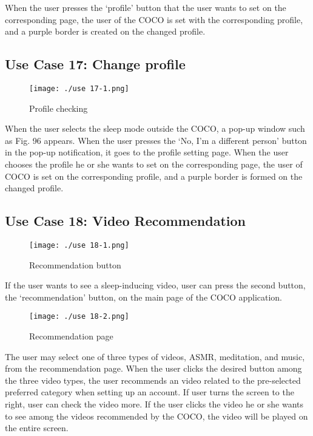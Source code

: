 \documentclass[conference]{IEEEtran}
\begin{document}
When the user presses the ‘profile’ button that the user wants to set on the corresponding page, the user of the COCO is set with the corresponding profile, and a purple border is created on the changed profile.

\subsection{Use Case 17: Change profile}

\begin{figure}[H]
\texttt{[image: ./use 17-1.png]}
\centering
\caption{Profile checking}
\end{figure}

When the user selects the sleep mode outside the COCO, a pop-up window such as Fig. 96 appears. When the user presses the ‘No, I'm a different person' button in the pop-up notification, it goes to the profile setting page. When the user chooses the profile he or she wants to set on the corresponding page, the user of COCO is set on the corresponding profile, and a purple border is formed on the changed profile.

\subsection{Use Case 18: Video Recommendation}

\begin{figure}[H]
\texttt{[image: ./use 18-1.png]}
\centering
\caption{Recommendation button}
\end{figure}

If the user wants to see a sleep-inducing video, user can press the second button, the ‘recommendation’ button, on the main page of the COCO application.

\begin{figure}[H]
\texttt{[image: ./use 18-2.png]}
\centering
\caption{Recommendation page}
\end{figure}

The user may select one of three types of videos, ASMR, meditation, and music, from the recommendation page. When the user clicks the desired button among the three video types, the user recommends an video related to the pre-selected preferred category when setting up an account. If user turns the screen to the right, user can check the video more. If the user clicks the video he or she wants to see among the videos recommended by the COCO, the video will be played on the entire screen.
\end{document}
